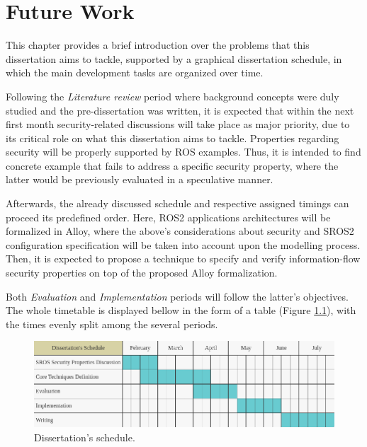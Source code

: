 \chapter{Future Work}\label{c:currWork}

This chapter provides a brief introduction over the problems that this dissertation aims to tackle, supported by a graphical dissertation schedule, in which the main development tasks are organized over time.

Following the \textit{Literature review} period where background concepts were duly studied and the pre-dissertation was written, it is expected that within the next first month security-related discussions will take place as major priority, due to its critical role on what this dissertation aims to tackle. Properties regarding security will be properly supported by ROS examples. Thus, it is intended to find concrete example that fails to address a specific security property, where the latter would be previously evaluated in a speculative manner. 

Afterwards, the already discussed schedule and respective assigned timings can proceed its predefined order. Here, ROS2 applications architectures will be formalized in Alloy, where the above's considerations about security and SROS2 configuration specification will be taken into account upon the modelling process. Then, it is expected to propose  a technique to specify and verify information-flow security properties on top of the proposed Alloy formalization.

Both \textit{Evaluation} and \textit{Implementation} periods will follow the latter's objectives. The whole timetable is displayed bellow in the form of a table (Figure \ref{fig:dissertation-schedule}), with the times evenly split among the several periods. 

\begin{figure}[H]
    \centering
    \includegraphics[width=\linewidth]{img/dissertation-schedule.png}
    \caption{Dissertation's schedule.}
    \label{fig:dissertation-schedule}
\end{figure}

